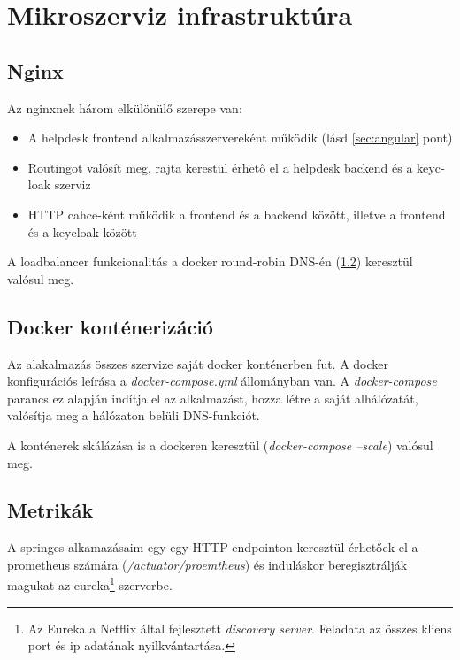 \section{Mikroszerviz infrastruktúra}

\subsection{Nginx}\label{sec:nginx}
Az nginxnek három elkülönülő szerepe van:

\begin{itemize}
	\item{A \foreignlanguage{british}{helpdesk frontend} alkalmazásszervereként működik (lásd \ref{sec:angular} pont)}
	
	\item{\foreignlanguage{british}{Routing}ot valósít meg, rajta kerestül érhető el a \foreignlanguage{british}{helpdesk backend} és a \foreignlanguage{british}{keycloak} szerviz}
	
	\item{\foreignlanguage{british}{HTTP cahce}-ként működik a frontend és a backend között, illetve a frontend és a keycloak között}
\end{itemize}

A loadbalancer funkcionalitás a \foreignlanguage{british}{docker round-robin DNS}-én (\ref{sec:docker}) keresztül valósul meg.


\subsection{Docker konténerizáció}\label{sec:docker}
Az alakalmazás összes szervize saját docker konténerben fut. A docker konfigurációs leírása a \textit{docker-compose.yml} állományban van. A \textit{docker-compose} parancs ez alapján indítja el az alkalmazást, hozza létre a saját alhálózatát, valósítja meg a hálózaton belüli DNS-funkciót.

A konténerek skálázása  is a dockeren keresztül (\textit{docker-compose --scale}) valósul meg.



\subsection{Metrikák}
A springes alkamazásaim egy-egy HTTP endpointon keresztül érhetőek el a prometheus számára (\textit{\mbox{/actuator/proemtheus}}) és induláskor beregisztrálják magukat az eureka\footnote{Az Eureka a Netflix által fejlesztett \textit{discovery server}. Feladata az összes kliens port és ip adatának nyilkvántartása.} szerverbe.

